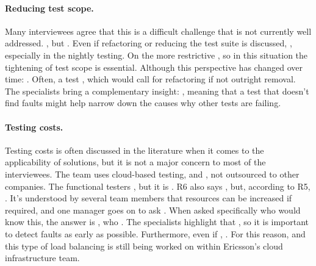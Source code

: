 \paragraph{Reducing test scope.} Many interviewees agree that this is a difficult challenge that is not currently well addressed.
, but .
Even if refactoring or reducing the test suite is discussed, , especially in the nightly testing.
On the more restrictive , so in this situation the tightening of test scope is essential.
Although this perspective has changed over time: .
Often, a test , which would call for refactoring if not outright removal.
The specialists bring a complementary insight: , meaning that a test that doesn't find faults might help narrow down the causes why other tests are failing.

\paragraph{Testing costs.}
Testing costs is often discussed in the literature when it comes to the applicability of solutions, but it is not a major concern to most of the interviewees.
The team uses cloud-based testing, and , not outsourced to other companies.
The functional testers , but it is .
R6 also says , but, according to R5, .
It's understood by several team members that resources can be increased if required, and one manager goes on to ask .
When asked specifically who would know this, the answer is , who .
The specialists highlight that , so it is important to detect faults as early as possible.
Furthermore, even if , .
For this reason,  and this type of load balancing is still being worked on within Ericsson's cloud infrastructure team.


